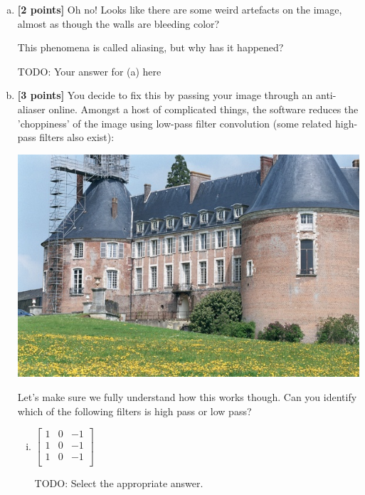 \begin{enumerate}[(a)]
\item \textbf{[2 points]} Oh no! Looks like there are some weird artefacts on the image, almost as though the walls are bleeding color? 
    
    \begin{tcolorbox}[colback=orange!5!white,colframe=orange!75!black]
This phenomena is called aliasing, but why has it happened?
\end{tcolorbox}
\begin{tcolorbox}[colback=white!5!white,colframe=green!75!black]
\begin{mdframed}
    TODO: Your answer for (a) here
\end{mdframed}
\end{tcolorbox}

\item \textbf{[3 points]}
You decide to fix this by passing your image through an anti-aliaser online. Amongst a host of complicated things, the software reduces the 'choppiness' of the image using low-pass filter convolution (some related high-pass filters also exist):

\includegraphics[width=\textwidth * 5/10]{images/castle-after.jpg}

\begin{tcolorbox}[colback=orange!5!white,colframe=orange!75!black]
Let's make sure we fully understand how this works though. Can you identify which of the following filters is high pass or low pass?
\end{tcolorbox}

\begin{enumerate}[(i)]
\item
 $\begin{bmatrix}
    1 & 0 & -1 \\
    1 & 0 & -1 \\
    1 & 0 & -1 \\
 \end{bmatrix}$
\begin{tcolorbox}[colback=white!5!white,colframe=green!75!black]
TODO: Select the appropriate answer.


\end{tcolorbox}
\end{enumerate}
\end{enumerate}
